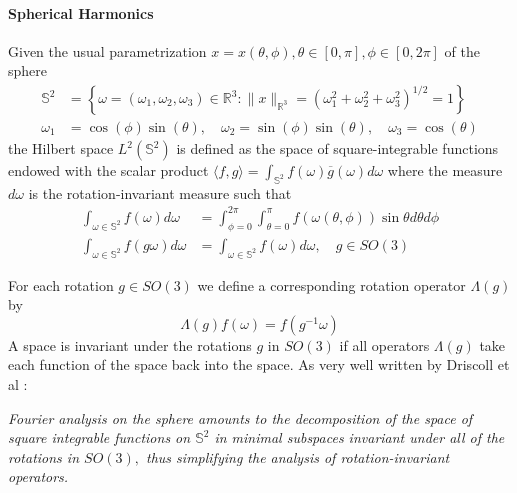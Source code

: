 \paragraph{Spherical Harmonics}
 Given the usual parametrization $x = x(\theta, \phi), \theta\in[0,\pi], \phi\in[0,2\pi]$ of the sphere
\begin{align*}
\mathbb{S}^{2}&=\left\{\omega=\left(\omega_{1}, \omega_{2}, \omega_{3}\right) \in \mathbb{R}^{3} :\|x\|_{\mathbb{R}^{3}}=\left(\omega_{1}^{2}+\omega_{2}^{2}+\omega_{3}^{2}\right)^{1 / 2}=1\right\}\\
\omega_{1}&=\cos (\phi) \sin (\theta), \quad \omega_{2}=\sin (\phi) \sin (\theta), \quad \omega_{3}=\cos (\theta)
\end{align*}
the Hilbert space $L^2(\mathbb S^2)$ is defined as the space of square-integrable functions endowed with the scalar product $\langle f,g\rangle=\int_{\mathbb S^2}f(\omega)\overline g(\omega)d\omega$ where the measure $d\omega$ is the rotation-invariant measure such that
\begin{align}
\int_{\omega \in \mathbb S^{2}} f(\omega) d \omega&=\int_{\phi=0}^{2 \pi} \int_{\theta=0}^{\pi} f(\omega(\theta, \phi)) \sin \theta d \theta d \phi\\
\int_{\omega \in \mathbb S^{2}} f(g \omega) d \omega&=\int_{\omega \in \mathbb S^{2}} f(\omega) d \omega, \quad g \in S O(3)
\end{align}

For each rotation $g\in SO(3)$ we define a corresponding rotation operator $\Lambda(g)$ by
$$
\Lambda(g) f(\omega)=f\left(g^{-1} \omega\right)
$$
A space is invariant under the rotations $g$ in $SO(3)$ if all operators $\Lambda(g)$ take each function of the space back into the space. As very well written by Driscoll et al \cite{Driscoll:1994:CFT:184069.184073}:

\vspace{0.2cm}
\textit{Fourier analysis on the sphere amounts to the decomposition of the space of square integrable functions on \(\mathbb S^{2}\) in minimal subspaces invariant under all of the rotations in \(S O(3),\) thus simplifying the analysis of rotation-invariant operators.}
\vspace{0.2cm}

